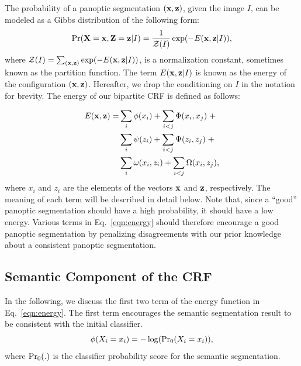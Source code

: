 The probability of a panoptic segmentation $(\mathbf{x}, \mathbf{z})$, given the image $I$, can be modeled as a Gibbs distribution of the following form:
\begin{equation}
\label{eqn:prob}
\Pr(\mathbf{X} = \mathbf{x}, \mathbf{Z} = \mathbf{z}|I) = \frac{1}{\mathcal{Z}(I)}\exp(-E(\mathbf{x}, \mathbf{z}|I)),
\end{equation}
where $\mathcal{Z}(I) = \sum_{(\mathbf{x},\mathbf{z})} \exp(-E(\mathbf{x}, \mathbf{z}|I))$, is a normalization constant, sometimes known as the partition function. The term $E(\mathbf{x}, \mathbf{z}|I)$ is known as the energy of the configuration $(\mathbf{x}, \mathbf{z})$. Hereafter, we drop the conditioning on $I$ in the notation for brevity. The energy of our bipartite CRF is defined as follows:

\begin{equation}
\label{eqn:energy}
\begin{split}
E(\mathbf{x}, \mathbf{z}) =& \sum_i\phi(x_i) + \sum_{i < j}\Phi(x_i, x_j) \;+ \\
& \sum_i\psi(z_i) + \sum_{i < j}\Psi(z_i, z_j) \; + \\
& \sum_i\omega(x_i, z_i) + \sum_{i < j}\Omega(x_i, z_j),
\end{split}
\end{equation}
where $x_i$ and $z_i$ are the elements of the vectors $\mathbf{x}$ and $\mathbf{z}$, respectively. The meaning of each term will be described in detail below. Note that, since a ``good'' panoptic segmentation should have a high probability, it should have a low energy. Various terms in Eq.~\eqref{eqn:energy} should therefore encourage a good panoptic segmentation by penalizing disagreements with our prior knowledge about a consistent panoptic segmentation. %

\subsection{Semantic Component of the CRF}
In the following, we discuss the first two term of the energy function in Eq.~\eqref{eqn:energy}. The first term encourages the semantic segmentation result to be consistent with the initial classifier.
\begin{equation}
\phi(X_i = x_i) = - \log(\operatorname{Pr_0}(X_i = x_i)),
\end{equation}
where $\operatorname{Pr_0}(.)$ is the classifier probability score for the semantic segmentation. 

